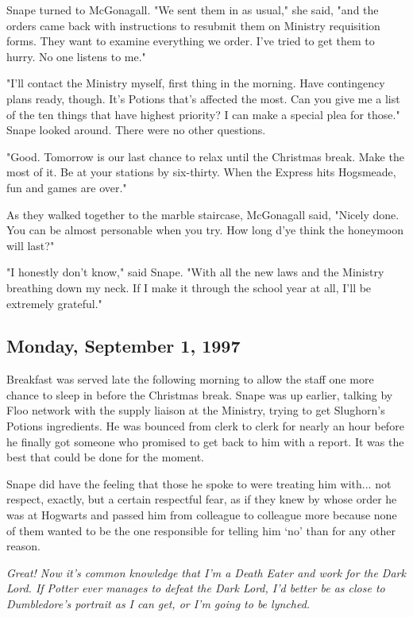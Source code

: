 \documentclass[a4paper,11pt]{article}
\begin{document}
Snape turned to McGonagall. "We sent them in as usual," she said, "and the orders came back with instructions to resubmit them on Ministry requisition forms. They want to examine everything we order. I've tried to get them to hurry. No one listens to me."

"I'll contact the Ministry myself, first thing in the morning. Have contingency plans ready, though. It's Potions that's affected the most. Can you give me a list of the ten things that have highest priority? I can make a special plea for those." Snape looked around. There were no other questions.

"Good. Tomorrow is our last chance to relax until the Christmas break. Make the most of it. Be at your stations by six-thirty. When the Express hits Hogsmeade, fun and games are over."

As they walked together to the marble staircase, McGonagall said, "Nicely done. You can be almost personable when you try. How long d'ye think the honeymoon will last?"

"I honestly don't know," said Snape. "With all the new laws and the Ministry breathing down my neck. If I make it through the school year at all, I'll be extremely grateful."

\subsection{Monday, September 1, 1997}

Breakfast was served late the following morning to allow the staff one more chance to sleep in before the Christmas break. Snape was up earlier, talking by Floo network with the supply liaison at the Ministry, trying to get Slughorn's Potions ingredients. He was bounced from clerk to clerk for nearly an hour before he finally got someone who promised to get back to him with a report. It was the best that could be done for the moment.

Snape did have the feeling that those he spoke to were treating him with... not respect, exactly, but a certain respectful fear, as if they knew by whose order he was at Hogwarts and passed him from colleague to colleague more because none of them wanted to be the one responsible for telling him `no' than for any other reason.

\emph{Great! Now it's common knowledge that I'm a Death Eater and work for the Dark Lord. If Potter ever manages to defeat the Dark Lord, I'd better be as close to Dumbledore's portrait as I can get, or I'm going to be lynched.}
\end{document}
